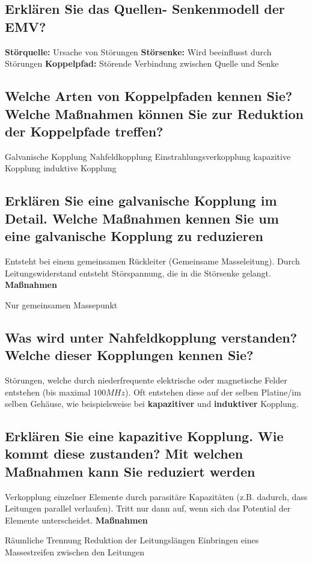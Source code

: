 \subsection{Erklären Sie das Quellen- Senkenmodell der EMV?}
\begin{outline}
  \1 \textbf{Störquelle:} Ursache von Störungen
  \1 \textbf{Störsenke:} Wird beeinflusst durch Störungen
  \1 \textbf{Koppelpfad:} Störende Verbindung zwischen Quelle und Senke
\end{outline}

\subsection{Welche Arten von Koppelpfaden kennen Sie? Welche Maßnahmen können Sie zur Reduktion der Koppelpfade treffen?}
\begin{outline}
  \1 Galvanische Kopplung
  \1 Nahfeldkopplung
  \1 Einstrahlungsverkopplung
  \1 kapazitive Kopplung
  \1 induktive Kopplung
\end{outline}

\subsection{Erklären Sie eine galvanische Kopplung im Detail. Welche Maßnahmen kennen Sie um eine galvanische Kopplung zu reduzieren}
Entsteht bei einem gemeinsamen Rückleiter (Gemeinsame Masseleitung). Durch Leitungswiderstand entsteht Störspannung, die in die Störsenke gelangt.\p
\textbf{Maßnahmen}
\begin{outline}
  \1 Nur gemeinsamen Massepunkt
\end{outline}


\subsection{Was wird unter Nahfeldkopplung verstanden? Welche dieser Kopplungen kennen Sie?}
Störungen, welche durch niederfrequente elektrische oder magnetische Felder entstehen (bis maximal \(100MHz\)). Oft entstehen diese auf der selben Platine/im selben Gehäuse, wie beispielsweise bei \textbf{kapazitiver} und \textbf{induktiver} Kopplung.


\subsection{Erklären Sie eine kapazitive Kopplung. Wie kommt diese zustanden? Mit welchen Maßnahmen kann Sie reduziert werden}
Verkopplung einzelner Elemente durch parasitäre Kapazitäten (z.B. dadurch, dass Leitungen parallel verlaufen). Tritt nur dann auf, wenn sich das Potential der Elemente unterscheidet.\p
\textbf{Maßnahmen}
\begin{outline}
  \1 Räumliche Trennung
  \1 Reduktion der Leitungslängen
  \1 Einbringen eines Massestreifen zwischen den Leitungen
\end{outline}

